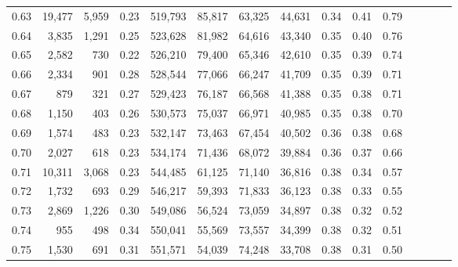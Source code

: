\begin{tabular}{rrrcrrrrrrrrrrr}
0.63 &  19,477 &   5,959 &                                       0.23 &  519,793 &   85,817 &   63,325 &   44,631 &  0.34 &  0.41 &                         0.79 \\
0.64 &   3,835 &   1,291 &                                       0.25 &  523,628 &   81,982 &   64,616 &   43,340 &  0.35 &  0.40 &                         0.76 \\
0.65 &   2,582 &     730 &                                       0.22 &  526,210 &   79,400 &   65,346 &   42,610 &  0.35 &  0.39 &                         0.74 \\
0.66 &   2,334 &     901 &                                       0.28 &  528,544 &   77,066 &   66,247 &   41,709 &  0.35 &  0.39 &                         0.71 \\
0.67 &     879 &     321 &                                       0.27 &  529,423 &   76,187 &   66,568 &   41,388 &  0.35 &  0.38 &                         0.71 \\
0.68 &   1,150 &     403 &                                       0.26 &  530,573 &   75,037 &   66,971 &   40,985 &  0.35 &  0.38 &                         0.70 \\
0.69 &   1,574 &     483 &                                       0.23 &  532,147 &   73,463 &   67,454 &   40,502 &  0.36 &  0.38 &                         0.68 \\
0.70 &   2,027 &     618 &                                       0.23 &  534,174 &   71,436 &   68,072 &   39,884 &  0.36 &  0.37 &                         0.66 \\
0.71 &  10,311 &   3,068 &                                       0.23 &  544,485 &   61,125 &   71,140 &   36,816 &  0.38 &  0.34 &                         0.57 \\
0.72 &   1,732 &     693 &                                       0.29 &  546,217 &   59,393 &   71,833 &   36,123 &  0.38 &  0.33 &                         0.55 \\
0.73 &   2,869 &   1,226 &                                       0.30 &  549,086 &   56,524 &   73,059 &   34,897 &  0.38 &  0.32 &                         0.52 \\
0.74 &     955 &     498 &                                       0.34 &  550,041 &   55,569 &   73,557 &   34,399 &  0.38 &  0.32 &                         0.51 \\
0.75 &   1,530 &     691 &                                       0.31 &  551,571 &   54,039 &   74,248 &   33,708 &  0.38 &  0.31 &                         0.50 \\

\end{tabular}
